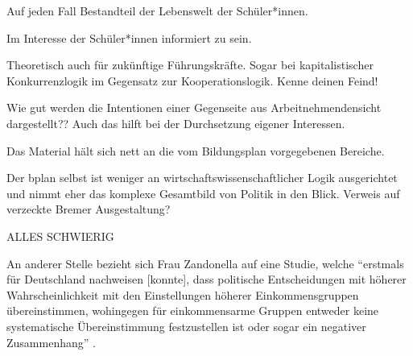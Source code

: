 Auf jeden Fall Bestandteil der Lebenswelt der Schüler*innen.

Im Interesse der Schüler*innen informiert zu sein.

Theoretisch auch für zukünftige Führungskräfte. Sogar bei kapitalistischer Konkurrenzlogik im Gegensatz zur Kooperationslogik. Kenne deinen Feind!

Wie gut werden die Intentionen einer Gegenseite aus Arbeitnehmendensicht dargestellt??
Auch das hilft bei der Durchsetzung eigener Interessen.

Das Material hält sich nett an die vom Bildungsplan vorgegebenen Bereiche. 

Der bplan selbst ist weniger an wirtschaftswissenschaftlicher Logik ausgerichtet und nimmt eher das komplexe Gesamtbild von Politik in den Blick.
Verweis auf verzeckte Bremer Ausgestaltung?

ALLES SCHWIERIG















An anderer Stelle bezieht sich Frau Zandonella auf eine Studie, welche \enquote{erstmals für Deutschland nachweisen [konnte], dass politische Entscheidungen mit höherer Wahrscheinlichkeit mit den Einstellungen höherer Einkommensgruppen übereinstimmen, wohingegen für einkommensarme Gruppen entweder keine systematische Übereinstimmung festzustellen ist oder sogar ein negativer Zusammenhang} \autocite[177]{Elsasser.2017}.



